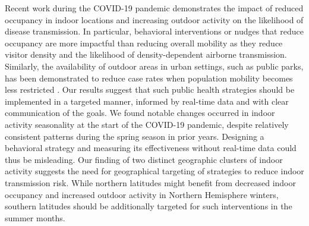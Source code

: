 \documentclass{article}
\begin{document}
Recent work during the COVID-19 pandemic demonstrates the impact of reduced occupancy in indoor locations and increasing outdoor activity on the likelihood of disease transmission. In particular, behavioral interventions or nudges that reduce occupancy are more impactful than reducing overall mobility as they reduce visitor density and the likelihood of density-dependent airborne transmission.
Similarly, the availability of outdoor areas in urban settings, such as public parks, has been demonstrated to reduce case rates when population mobility becomes less restricted \cite{johnson2021landscape}.
Our results suggest that such public health strategies should be implemented in a targeted manner, informed by real-time data and with clear communication of the goals.
We found notable changes occurred in indoor activity seasonality at the start of the COVID-19 pandemic, despite relatively consistent patterns during the spring season in prior years. Designing a behavioral strategy and measuring its effectiveness without real-time data could thus be misleading.
Our finding of two distinct geographic clusters of indoor activity suggests the need for geographical targeting of strategies to reduce indoor transmission risk. While northern latitudes might benefit from decreased indoor occupancy and increased outdoor activity in Northern Hemisphere winters, southern latitudes should be additionally targeted for such interventions in the summer months.
\end{document}
